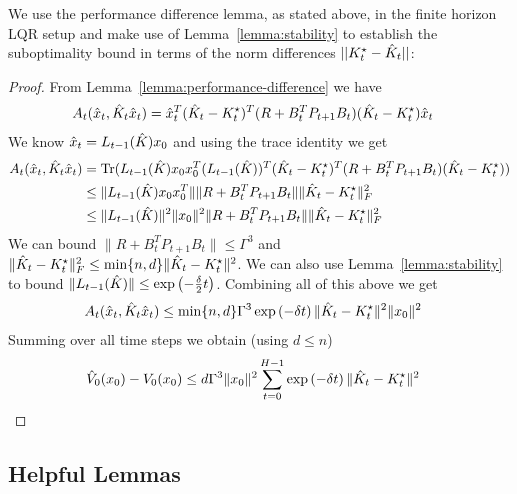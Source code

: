 We use the performance difference lemma, as stated above, in the finite horizon
LQR setup and make use of Lemma~\ref{lemma:stability} to establish the
suboptimality bound in terms of the norm differences $||K^\star_{t} - \hat{K}_{t}||$:
\costTheorem*
\begin{proof}
  From Lemma~\ref{lemma:performance-difference} we have
  \begin{align*}
    A_{t}(\hat{x}_{t}, \hat{K}_{t}\hat{x}_{t}) &= \hat{x}_{t}^{T}(\hat{K}_{t} - K^\star_{t})^{T}(R + B_{t}^{T}P_{t+1}B_{t})(\hat{K}_{t} - K^\star_{t})\hat{x}_{t}
  \end{align*}
  We know $\hat{x}_{t} = L_{t-1}(\hat{K})x_{0}$ and using the trace identity we get
  \begin{align*}
    A_{t}(\hat{x}_{t}, \hat{K}_{t}\hat{x}_{t}) &= \mathrm{Tr}(L_{t-1}(\hat{K})x_{0}x_{0}^{T}(L_{t-1}(\hat{K}))^{T}(\hat{K}_{t} - K^\star_{t})^{T}(R + B_{t}^{T}P_{t+1}B_{t})(\hat{K}_{t} - K^\star_{t})) \\
                                         &\leq \|L_{t-1}(\hat{K})x_{0}x_{0}^{T}\| \|R + B_{t}^{T}P_{t+1}B_{t}\| \|\hat{K}_{t} - K^\star_{t}\|_{F}^{2} \\
    &\leq \|L_{t-1}(\hat{K})\|^{2}\|x_{0}\|^{2} \|R + B_{t}^{T}P_{t+1}B_{t}\| \|\hat{K}_{t} - K^\star_{t}\|_{F}^{2}
  \end{align*}
  We can bound $\|R + B_{t}^{T}P_{t+1}B_{t}\| \leq \Gamma^{3}$ and
  $\|\hat{K}_{t} - K^\star_{t}\|_{F}^{2} \leq \min\{n, d\} \|\hat{K}_{t} - K^\star_{t}\|^{2}$.
  We can also use Lemma~\ref{lemma:stability} to bound
  $\|L_{{t-1}}(\hat{K})\| \leq \exp\left(-\frac{\delta}{2}t\right)$.
  Combining all
  of this above we get
  \begin{align*}
    A_{t}(\hat{x}_{t}, \hat{K}_{t}\hat{x}_{t}) &\leq \min\{n, d\}\Gamma^{3} \exp\left(-\delta t\right)\|\hat{K}_{t} - K^\star_{t}\|^{2}\|x_{0}\|^{2}
  \end{align*}
  Summing over all time steps we
  obtain (using $d \leq n$)
  \begin{align*}
    \hat{V}_0(x_0) - V_0(x_0) &\leq d\Gamma^{3}\|x_{0}\|^{2} \sum_{t=0}^{H-1} \exp\left(-\delta t\right)\|\hat{K}_{t} - K^\star_{t}\|^{2}
  \end{align*}
\end{proof}

\subsection{Helpful Lemmas}
\label{sec:helpful-lemmas}

